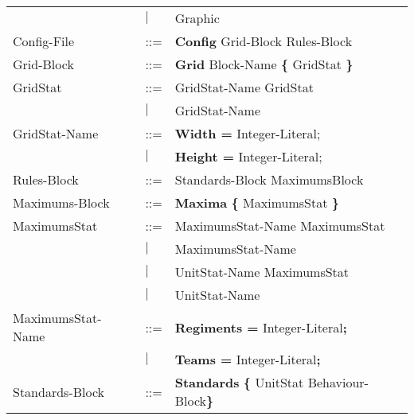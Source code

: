 \begin{center}
\begin{longtable}{l l l}
									&$\mid$	&Graphic\\
				Config-File			&	::=	&{\bf Config} Grid-Block Rules-Block\\
				Grid-Block			&	::=	&{\bf Grid} Block-Name	 {\bf \{} GridStat \bf{\}}\\
				GridStat			&	::=	&GridStat-Name GridStat\\
									&$\mid$	&GridStat-Name\\
				GridStat-Name		&	::=	&{\bf Width = } Integer-Literal;\\
									&$\mid$	&{\bf Height = } Integer-Literal;\\
				Rules-Block			&	::=	&Standards-Block MaximumsBlock\\
				Maximums-Block		&	::=	&{\bf Maxima} {\bf \{} MaximumsStat {\bf \}} \\
				MaximumsStat		&	::=	&MaximumsStat-Name MaximumsStat\\
									&$\mid$	&MaximumsStat-Name\\
									&$\mid$	&UnitStat-Name MaximumsStat\\
									&$\mid$	&UnitStat-Name\\
				MaximumsStat-Name	&	::=	&{\bf Regiments = } Integer-Literal{\bf ;}\\
									&$\mid$	&{\bf Teams = } Integer-Literal{\bf ;}\\
				Standards-Block		&	::=	&{\bf Standards} {\bf \{ } UnitStat Behaviour-Block\bf{\} }\\
				\end{longtable}
		\end{center}
		
